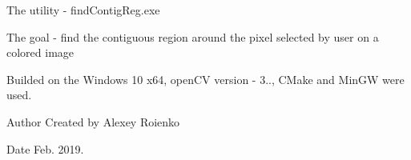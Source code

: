The utility -\/ find\+Contig\+Reg.\+exe

The goal -\/ find the contiguous region around the pixel selected by user on a colored image

Builded on the Windows 10 x64, open\+CV version -\/ 3.., C\+Make and Min\+GW were used.

\begin{DoxyAuthor}{Author}
Created by Alexey Roienko
\end{DoxyAuthor}
\begin{DoxyDate}{Date}
Feb. 2019. 
\end{DoxyDate}
